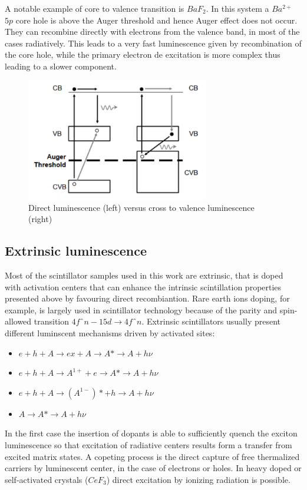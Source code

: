A notable example of core to valence transition is $BaF_{2}$. In this system a $Ba^{2+}$ $5p$ core hole is above the Auger threshold and hence Auger effect does not occur. They can recombine directly with electrons from the valence band, in most of the cases radiatively.
This leads to a very fast luminescence given by recombination of the core hole, while the primary electron de excitation is more complex thus leading to a slower component.

\begin{figure}
\centering
\includegraphics[width=8cm]{../Pictures/Chapter_2/core_to_valence.pdf}
\caption[Core to valence luminescence]{Direct luminescence (left) versus cross to valence luminescence (right)}
\label{fig:CTV}
\end{figure}
 

\subsection{Extrinsic luminescence}

Most of the scintillator samples used in this work are extrinsic, that is doped with activation centers that can enhance the intrinsic scintillation properties presented above by favouring direct recombiantion.
Rare earth ions doping, for example, is largely used in scintillator technology because of the parity and spin-allowed transition $4fˆ{n-1}5d\rightarrow 4fˆ{n}$. 
Extrinsic scintillators usually present different luminscent mechanisms driven by activated sites\cite{Lecoq2006}:
\begin{itemize}
\item $e + h + A \rightarrow ex + A \rightarrow A* \rightarrow A + h\nu$
\item $e + h + A \rightarrow A^{1+} + e \rightarrow A* \rightarrow A + h\nu$
\item $e + h + A \rightarrow (A^{1-})* + h \rightarrow A + h\nu$
\item $A \rightarrow A* \rightarrow A + h\nu$
\end{itemize}
In the first case the insertion of dopants is able to sufficiently quench the exciton luminescence so that excitation of radiative centers results form a transfer from excited matrix states.
A copeting process is the direct capture of free thermalized carriers by luminescent center, in the case of electrons or holes.
In heavy doped or self-activated crystals ($CeF_{3}$) direct excitation by ionizing radiation is possible.

